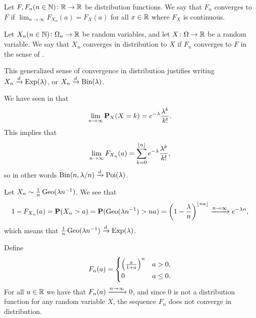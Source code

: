 \documentclass[11pt,a4paper]{article}
\begin{document}
\begin{definition}
  \label{def:convergence-of-distribution-functions}
  Let $F,F_n(n \in \mathbb{N}) \colon \mathbb{R} \to \mathbb{R}$ be distribution functions.
  We say that $F_n$ converges to $F$ if
  $\lim_{n \to \infty} F_{X_n}(a) = F_X(a)$ for all $x \in \mathbb{R}$
  where $F_X$ is continuous.
\end{definition}

\begin{definition}
  Let $X_n(n \in \mathbb{N}) \colon \Omega_n \to \mathbb{R}$ be random variables,
  and let $X \colon \Omega \to \mathbb{R}$ be a random variable.
  We say that $X_n$ converges in distribution to $X$
  if $F_n$ converges to $F$ in the sense of
  .
\end{definition}

\begin{remark}
  This generalized sense of convergence in distribution
  justifies writing $X_n \xrightarrow{d} \operatorname{Exp}(\lambda)$,
  or $X_n \xrightarrow{d} \operatorname{Bin}(\lambda)$.
\end{remark}

\begin{example}
  We have seen in 
  that
  \[
    \lim_{n\to\infty}\mathbf{P}_X(X=k) =
    e^{-\lambda}{\frac{\lambda^{k}}{k!}}.
  \]
  This implies that
  \[
    \lim_{n \to \infty} F_{X_n}(a) =
    \sum_{k=0}^{\left\lfloor a \right\rfloor} e^{-\lambda}{\frac{\lambda^{k}}{k!}},
  \]
  so in other words $\operatorname{Bin}(n,\lambda/n) \xrightarrow{d} \operatorname{Poi}(\lambda)$.
\end{example}
\begin{example}
  Let $X_n \sim \frac{1}{n} \operatorname{Geo}(\lambda n^{-1})$.
  We see that
  \[
    1 - F_{X_n}(a) =
    \Prob(X_n > a) =
    \Prob(\Geo(\lambda n^{-1}) > na) =
    \del{1 - \frac{\lambda}{n}}^{\floor{na}} \taking{n \to \infty} e^{-\lambda n},
  \]
  which means that $\frac{1}{n} \operatorname{Geo}(\lambda n^{-1}) \xrightarrow{d} \operatorname{Exp}(\lambda)$.
\end{example}
\begin{example}
  Define
  \[
    F_n(a) =
    \begin{cases}
      \del{\frac{a}{1+a}}^n & a > 0, \\
      0 & a \le 0.
    \end{cases}
  \]
  For all $a \in \mathbb{R}$ we have that $F_n(a) \xrightarrow{n \to \infty} 0$,
  and since $0$ is not a distribution function for any random variable $X$,
  the sequence $F_n$ does not converge in distribution.
\end{example}
\end{document}
